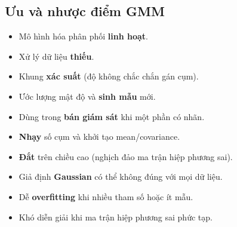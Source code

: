 
\subsection{Ưu và nhược điểm GMM}

\begin{tinhchat}[title={Ưu điểm}]
\begin{itemize}
  \item Mô hình hóa phân phối \textbf{linh hoạt}.
  \item Xử lý dữ liệu \textbf{thiếu}.
  \item Khung \textbf{xác suất} (độ không chắc chắn gán cụm).
  \item Ước lượng mật độ và \textbf{sinh mẫu} mới.
  \item Dùng trong \textbf{bán giám sát} khi một phần có nhãn.
\end{itemize}
\end{tinhchat}

\begin{luuy}[title={Nhược điểm}]
\begin{itemize}
  \item \textbf{Nhạy} số cụm và khởi tạo mean/covariance.
  \item \textbf{Đắt} trên chiều cao (nghịch đảo ma trận hiệp phương sai).
  \item Giả định \textbf{Gaussian} có thể không đúng với mọi dữ liệu.
  \item Dễ \textbf{overfitting} khi nhiều tham số hoặc ít mẫu.
  \item Khó diễn giải khi ma trận hiệp phương sai phức tạp.
\end{itemize}
\end{luuy}
